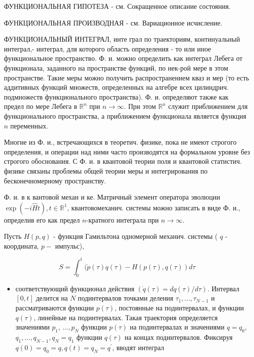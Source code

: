 \documentclass[10pt]{article}
\begin{document}
ФУНКЦИОНАЛЬНАЯ ГИПОТЕЗА - см. Сокращенное описание состояния.



ФУНКЦИОНАЛЬНАЯ ПРОИЗВОДНАЯ - см. Вариационное исчисление.



ФУНКЦИОНАЛЬНЫЙ ИНТЕГРАЛ, инте грал по траекториям, континуальный интеграл,- интеграл, для которого область определения - то или иное функциональное пространство. Ф. и. можно определить как интеграл Лебега от функционала, заданного на пространстве функций, по нек-рой мере в этом пространстве. Такие меры можно получить распространением кваз и мер (то есть аддитивных функций множеств, определенных на алгебре всех цилиндрич. подмножеств функционального пространства). Ф. и. определяют также как предел по мере Лебега в $\mathbb{R}^{n}$ при $n \rightarrow \infty$. При этом $\mathbb{R}^{n}$ служит приближением для функционального пространства, а приближением функционала является функция $n$ переменных.



Многие из Ф. и., встречающихся в теоретич. физике, пока не имеют строгого определения, и операции над ними часто производятся на формальном уровне без строгого обоснования. С Ф. и. в квантовой теории поля и квантовой статистич. физике связаны проблемы общей теории меры и интегрирования по бесконечномерному пространству.



Ф. и. в к вантовой механ и ке. Матричный элемент оператора эволюции $\exp (-i \hat{H} t), t \in \mathbb{R}^{1}$, квантовомеханич. системы можно записать в виде Ф. и., определив его как предел $n$-кратного интеграла при $n \rightarrow \infty$.



Пусть $H(p, q)$ - функция Гамильтона одномерной механич. системы ( $q$ - координата, $p-$ импульс),



\[

S=\int_{0}^{t}(\dot{p}(\tau) q(\tau)-H(p(\tau), q(\tau)) d \tau

\]



\begin{itemize}

  \item соответствующий функционал действия $(\dot{q}(\tau)=d q(\tau) / d \tau)$. Интервал $[0, t]$ делится на $N$ подинтервалов точками деления $\tau_{1}, \ldots, \tau_{N-1}$ и рассматриваются функции $p(\tau)$, постоянные на подинтервалах, и функции $q(\tau)$, линейные на подинтервалах. Такая траектория определяется значениями $p_{1}$, $\ldots, p_{N}$ функции $p(\tau)$ на подинтервалах и значениями $q=q_{0}$, $q_{1}, \ldots, q_{N-1}, q_{N}=q_{1}$ функции $q(\tau)$ на концах подинтервалов. Фиксируя $q(0)=q_{0}=q, q(t)=q_{N}=q^{\prime}$, вводят интеграл

\end{itemize}
\end{document}
